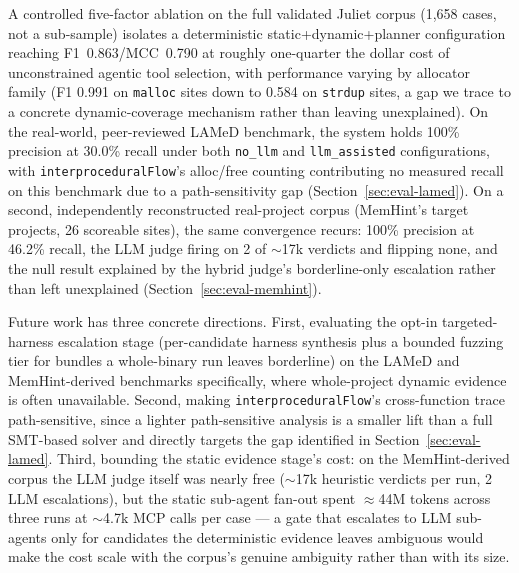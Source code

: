 \documentclass[11pt,a4paper]{article}
\begin{document}
A controlled
five-factor ablation on the full validated Juliet corpus (1{,}658 cases, not
a sub-sample) isolates a deterministic static+dynamic+planner configuration
reaching F1~0.863/MCC~0.790 at roughly one-quarter the dollar cost of
unconstrained agentic tool selection, with performance varying by
allocator family (F1 0.991 on \texttt{malloc} sites down to 0.584 on
\texttt{strdup} sites, a gap we trace to a concrete dynamic-coverage
mechanism rather than leaving unexplained). On the real-world,
peer-reviewed LAMeD benchmark, the system holds 100\% precision at 30.0\%
recall under both \texttt{no\_llm} and \texttt{llm\_assisted}
configurations, with \texttt{interproceduralFlow}'s alloc/free counting
contributing no measured recall on this benchmark due to a path-sensitivity
gap (Section~\ref{sec:eval-lamed}). On a second, independently
reconstructed real-project corpus (MemHint's target projects, 26
scoreable sites), the same convergence recurs: 100\% precision at 46.2\%
recall, the LLM judge firing on 2 of $\sim$17k verdicts and flipping
none, and the null result explained by the hybrid judge's borderline-only
escalation rather than left unexplained (Section~\ref{sec:eval-memhint}).

Future work has three concrete directions. First, evaluating the opt-in
targeted-harness escalation stage (per-candidate harness synthesis plus a
bounded fuzzing tier for bundles a whole-binary run leaves borderline) on
the LAMeD and MemHint-derived benchmarks specifically, where whole-project
dynamic evidence is often unavailable. Second, making
\texttt{interproceduralFlow}'s cross-function
trace path-sensitive, since a lighter path-sensitive analysis is a smaller
lift than a full SMT-based solver and directly targets the gap identified
in Section~\ref{sec:eval-lamed}. Third, bounding the static evidence
stage's cost: on the MemHint-derived corpus the LLM judge itself was
nearly free ($\sim$17k heuristic verdicts per run, 2 LLM escalations),
but the static sub-agent fan-out spent $\approx$44M tokens across three
runs at $\sim$4.7k MCP calls per case --- a gate that escalates to LLM
sub-agents only for candidates the deterministic evidence leaves ambiguous
would make the cost scale with the corpus's genuine ambiguity rather than
with its size.
\end{document}
